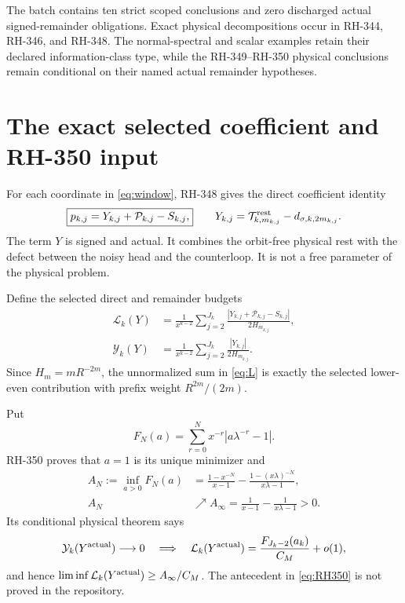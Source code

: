 \documentclass[11pt]{article}
\theoremstyle{definition}
\theoremstyle{remark}
\newcommand{\cP}{\mathcal P}
\newcommand{\cT}{\mathcal T}
\newcommand{\cY}{\mathcal Y}
\newcommand{\cL}{\mathcal L}
\begin{document}
The batch contains ten strict scoped conclusions and zero discharged actual
signed-remainder obligations.  Exact physical decompositions occur in
RH-344, RH-346, and RH-348.  The normal-spectral and scalar examples retain
their declared information-class type, while the RH-349--RH-350 physical
conclusions remain conditional on their named actual remainder hypotheses.

\section{The exact selected coefficient and RH-350 input}

For each coordinate in \eqref{eq:window}, RH-348 gives the direct coefficient
identity
\begin{equation}\label{eq:direct}
 \boxed{
 p_{k,j}=Y_{k,j}+\cP_{k,j}-S_{k,j},}
 \qquad
 Y_{k,j}=\cT_{k,m_{k,j}}^{\rm rest}
 -d_{\sigma,k,2m_{k,j}}.
\end{equation}
The term $Y$ is signed and actual.  It combines the orbit-free physical rest
with the defect between the noisy head and the counterloop.  It is not a
free parameter of the physical problem.

Define the selected direct and remainder budgets
\begin{align}
 \cL_k(Y)&=\frac1{x^{k-2}}
 \sum_{j=2}^{J_k}
 \frac{|Y_{k,j}+\cP_{k,j}-S_{k,j}|}{2H_{m_{k,j}}},
 \label{eq:L}\\
 \cY_k(Y)&=\frac1{x^{k-2}}
 \sum_{j=2}^{J_k}
 \frac{|Y_{k,j}|}{2H_{m_{k,j}}}.
 \label{eq:Yagg}
\end{align}
Since $H_m=mR^{-2m}$, the unnormalized sum in \eqref{eq:L} is exactly the
selected lower-even contribution with prefix weight $R^{2m}/(2m)$.

Put
\begin{equation}\label{eq:F}
 F_N(a)=\sum_{r=0}^{N}x^{-r}|a\lambda^{-r}-1|.
\end{equation}
RH-350 proves that $a=1$ is its unique minimizer and
\begin{align}
 A_N:=\inf_{a>0}F_N(a)
 &=\frac{1-x^{-N}}{x-1}
 -\frac{1-(x\lambda)^{-N}}{x\lambda-1},
 \label{eq:AN}\\
 A_N&\nearrow A_\infty
 =\frac1{x-1}-\frac1{x\lambda-1}>0.
 \label{eq:Ainf}
\end{align}
Its conditional physical theorem says
\begin{equation}\label{eq:RH350}
 \cY_k(Y^{\rm actual})\longrightarrow0
 \quad\Longrightarrow\quad
 \cL_k(Y^{\rm actual})
 =\frac{F_{J_k-2}(a_k)}{C_M}+o(1),
\end{equation}
and hence $\liminf\cL_k(Y^{\rm actual})\ge A_\infty/C_M$.
The antecedent in \eqref{eq:RH350} is not proved in the repository.
\end{document}
